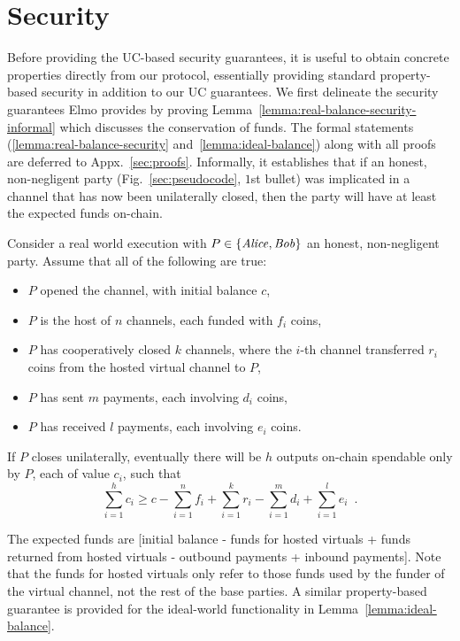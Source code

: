 \section{Security}
  \label{section:security}
    Before providing the UC-based security guarantees, it is useful to obtain
  concrete properties directly from our protocol, essentially providing standard
  property-based security in addition to our UC guarantees. We first delineate the
  security guarantees Elmo provides by proving
  Lemma~\ref{lemma:real-balance-security-informal} which discusses the
  conservation of funds. The formal statements
  (\ref{lemma:real-balance-security} and~\ref{lemma:ideal-balance}) along with
  all proofs are deferred
  to Appx.~\ref{sec:proofs}. Informally, it
  establishes that if an honest, non-negligent party (Fig.~\ref{sec:pseudocode},
  $1$st bullet) was implicated in a channel
  that has now been unilaterally closed,
  then the party will have at least the expected funds on-chain.

\begin{lemma}
\label{lemma:real-balance-security-informal}
  Consider a real world execution with $P \in \{\mathit{Alice}, \mathit{Bob}\}$ an honest,
  non-negligent party. Assume that all of the following are true:
  \begin{itemize}
    \item $P$ opened the channel, with initial balance $c$,
    \item $P$ is the host of $n$ channels, each funded with $f_i$ coins,
    \item $P$ has cooperatively closed $k$ channels, where the $i$-th channel
    transferred $r_i$ coins from the hosted virtual channel to $P$,
    \item $P$ has sent $m$ payments, each involving $d_i$ coins,
    \item $P$ has received $l$ payments, each involving $e_i$ coins.
  \end{itemize}
  If $P$ closes unilaterally, eventually there will be $h$ outputs on-chain
  spendable only by $P$, each of value $c_i$, such that
  \begin{equation}
    \sum\limits_{i=1}^h c_i \geq c - \sum\limits_{i=1}^n f_i +
    \sum\limits_{i=1}^k r_i - \sum\limits_{i=1}^m d_i + \sum\limits_{i=1}^l e_i
    \enspace.
  \end{equation}
\end{lemma}

  The expected funds are [initial balance - funds for hosted
  virtuals + funds returned from hosted virtuals - outbound payments + inbound
  payments]. Note that the funds for hosted virtuals only refer to those funds
  used by the funder of the virtual channel, not the rest of the base parties. A
  similar property-based guarantee is provided for the ideal-world functionality
  \fchan in Lemma~\ref{lemma:ideal-balance}.

